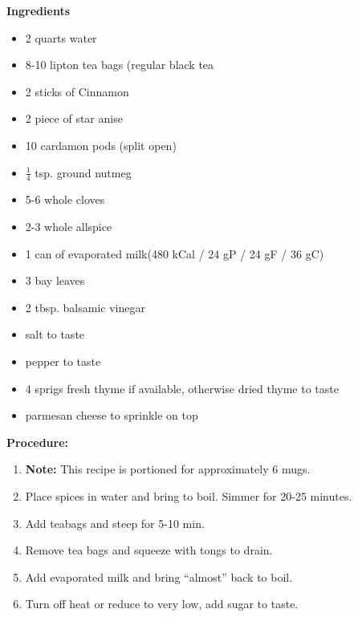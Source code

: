 \documentclass{report}
\begin{document}


\bigskip

\bigskip

\begin{multicols}{2}
\textbf{Ingredients}
\begin{itemize}
\item 2 quarts water
\item 8-10 lipton tea bags (regular black tea
\item 2 sticks of Cinnamon
\item 2 piece of star anise
\item 10 cardamon pods (split open)
\item $\frac{1}{4}$ tsp. ground nutmeg
\item 5-6 whole cloves
\item 2-3 whole allspice 
\item 1 can of evaporated milk\newline (480 kCal / 24 gP / 24 gF / 36 gC)
\item 3 bay leaves
\item 2 tbsp. balsamic vinegar
\item salt to taste
\item pepper to taste
\item 4 sprigs fresh thyme if available, otherwise dried thyme to taste
\item parmesan cheese to sprinkle on top 


\end{itemize}


\columnbreak
\textbf{Procedure:}
\medskip


\begin{enumerate}
\item \textbf{Note:} This recipe is portioned for approximately 6 mugs. 
\item Place spices in water and bring to boil. Simmer for 20-25 minutes. 

\item Add teabags and steep for 5-10 min.

\item Remove tea bags and squeeze with tongs to drain. 

\item Add evaporated milk and bring “almost” back to boil.

\item Turn off heat or reduce to very low, add sugar to taste.  




\end{enumerate}
\end{multicols}
\end{document}
